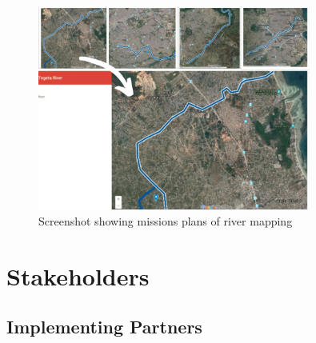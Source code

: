 \documentclass[a4paper,12pt,twoside]{article}
\begin{document}
        \begin{figure}%
            \centering
            \includegraphics[width=0.8\textwidth]{images/image14.jpg}
            \caption{Screenshot showing missions plans of river mapping}
        \end{figure}

\section{Stakeholders}

\subsection{Implementing Partners}
\end{document}
